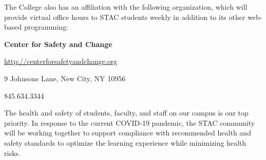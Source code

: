 \documentclass[11pt,letterpaper]{article}
\begin{document}
The College also has an affiliation with the following organization, which will provide virtual office hours to STAC students weekly in addition to its other web-based programming: 





\newpage




 
        \hspace{0.3cm} {\bfseries Center for Safety and Change} \par
        \hspace{0.3cm} \url{http://centerforsafetyandchange.org} \par
        \hspace{0.3cm} 9 Johnsons Lane, New City, NY 10956 \par
        \hspace{0.3cm} 845.634.3344
\sectionbreak




The health and safety of students, faculty, and staff on our campus is our top priority. In response to the current COVID-19 pandemic, the STAC community will be working together to support compliance with recommended health and safety standards to optimize the learning experience while minimizing health risks.
\end{document}
